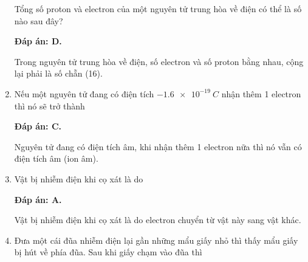 \begin{enumerate}[label=\bfseries Câu \arabic*:]
	\cauhoi
	{Tổng số proton và electron của một nguyên tử trung hòa về điện có thể là số nào sau đây?
		
	}
	\loigiai
	{	\textbf{Đáp án: D.}
		
		Trong nguyên tử trung hòa về điện, số electron và số proton bằng nhau, cộng lại phải là số chẵn (16).
	}
	\item {}
	
	\cauhoi
	{Nếu một nguyên tử đang có điện tích $\SI{-1.6e-19}{C}$ nhận thêm 1 electron thì nó sẽ trở thành
		
	}
	\loigiai
	{	\textbf{Đáp án: C.}
		
		Nguyên tử đang có điện tích âm, khi nhận thêm 1 electron nữa thì nó vẫn có điện tích âm (ion âm).
	}
	\item {}
	
	\cauhoi
	{Vật bị nhiễm điện khi cọ xát là do
		
	}
	\loigiai
	{	\textbf{Đáp án: A.}
		
		Vật bị nhiễm điện khi cọ xát là do electron chuyển từ vật này sang vật khác.
	}
	\item {}
	
	\cauhoi
	{Đưa một cái đũa nhiễm điện lại gần những mẩu giấy nhỏ thì thấy mẩu giấy bị hút về phía đũa. Sau khi giấy chạm vào đũa thì
		
}
\end{enumerate}
